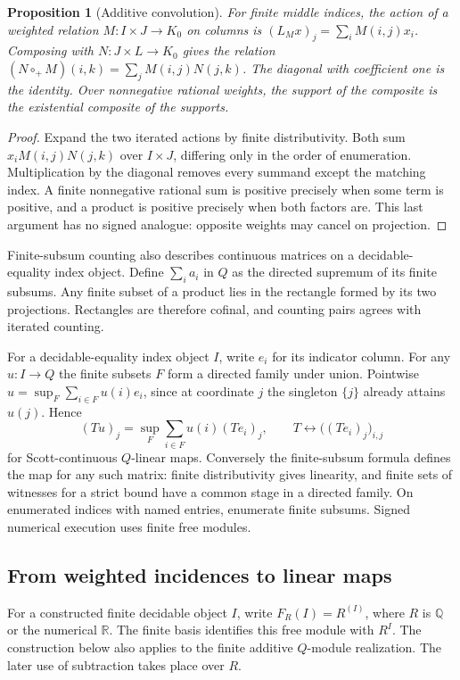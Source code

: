 \documentclass[11pt,a4paper]{article}
\newtheorem{proposition}[proposition]{Proposition}
\theoremstyle{definition}
\theoremstyle{remark}\newaliascnt{remark}{theorem}
\newcommand{\Q}{\mathbb Q}
\newcommand{\R}{\mathbb R}
\numberwithin{equation}{section}
\begin{document}
\begin{proposition}[Additive convolution]\label{prop:conv}
For finite middle indices, the action of a weighted relation \(M:I\times J\to K_0\) on columns is \((L_Mx)_j=\sum_i M(i,j)x_i\). Composing with \(N:J\times L\to K_0\) gives the relation \((N\circ_+ M)(i,k)=\sum_j M(i,j)N(j,k)\). The diagonal with coefficient one is the identity. Over nonnegative rational weights, the support of the composite is the existential composite of the supports.
\end{proposition}
\begin{proof}
Expand the two iterated actions by finite distributivity. Both sum \(x_iM(i,j)N(j,k)\) over \(I\times J\), differing only in the order of enumeration. Multiplication by the diagonal removes every summand except the matching index. A finite nonnegative rational sum is positive precisely when some term is positive, and a product is positive precisely when both factors are. This last argument has no signed analogue: opposite weights may cancel on projection.
\end{proof}
Finite-subsum counting also describes continuous matrices on a decidable-equality index object. Define $\sum_i a_i$ in $Q$ as the directed supremum of its finite subsums. Any finite subset of a product lies in the rectangle formed by its two projections. Rectangles are therefore cofinal, and counting pairs agrees with iterated counting.

For a decidable-equality index object \(I\), write \(e_i\) for its indicator column. For any \(u:I\to Q\) the finite subsets \(F\) form a directed family under union. Pointwise \(u=\sup_F\sum_{i\in F}u(i)e_i\), since at coordinate \(j\) the singleton \(\{j\}\) already attains \(u(j)\). Hence
\[
 (Tu)_j=\sup_F\sum_{i\in F}u(i)(Te_i)_j,\qquad
 T\longleftrightarrow\big((Te_i)_j\big)_{i,j}
\]
for Scott-continuous \(Q\)-linear maps. Conversely the finite-subsum formula defines the map for any such matrix: finite distributivity gives linearity, and finite sets of witnesses for a strict bound have a common stage in a directed family. On enumerated indices with named entries, enumerate finite subsums. Signed numerical execution uses finite free modules.

\subsection{From weighted incidences to linear maps}
For a constructed finite decidable object $I$, write $F_R(I)=R^{(I)}$, where $R$ is $\Q$ or the numerical $\R$. The finite basis identifies this free module with $R^I$. The construction below also applies to the finite additive $Q$-module realization. The later use of subtraction takes place over $R$.
\end{document}

